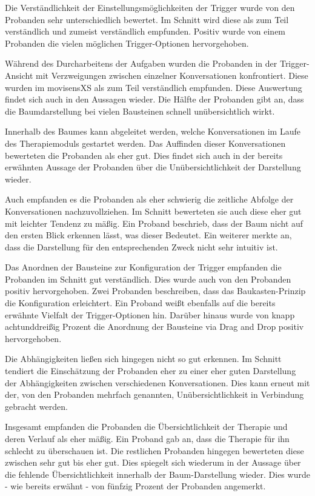 Die Verständlichkeit der Einstellungsmöglichkeiten der Trigger wurde von den Probanden sehr unterschiedlich bewertet. Im Schnitt wird diese als zum Teil verständlich und zumeist verständlich empfunden. Positiv wurde von einem Probanden die vielen möglichen Trigger-Optionen hervorgehoben.

Während des Durcharbeitens der Aufgaben wurden die Probanden in der Trigger-Ansicht mit Verzweigungen zwischen einzelner Konversationen konfrontiert. Diese wurden im movisensXS als zum Teil verständlich empfunden. Diese Auswertung findet sich auch in den Aussagen wieder. Die Hälfte der Probanden gibt an, dass die Baumdarstellung bei vielen Bausteinen schnell unübersichtlich wirkt. 

Innerhalb des Baumes kann abgeleitet werden, welche Konversationen im Laufe des Therapiemoduls gestartet werden. Das Auffinden dieser Konversationen bewerteten die Probanden als eher gut. Dies findet sich auch in der bereits erwähnten Aussage der Probanden über die Unübersichtlichkeit der Darstellung wieder. 

Auch empfanden es die Probanden als eher schwierig die zeitliche Abfolge der Konversationen nachzuvollziehen. Im Schnitt bewerteten sie auch diese eher gut mit leichter Tendenz zu mäßig. Ein Proband beschrieb, dass der Baum nicht auf den ersten Blick erkennen lässt, was dieser Bedeutet. Ein weiterer merkte an, dass die Darstellung für den entsprechenden Zweck nicht sehr intuitiv ist. 

Das Anordnen der Bausteine zur Konfiguration der Trigger empfanden die Probanden im Schnitt gut verständlich. Dies wurde auch von den Probanden positiv hervorgehoben. Zwei Probanden beschreiben, dass das Baukasten-Prinzip die Konfiguration erleichtert. Ein Proband weißt ebenfalls auf die bereits erwähnte Vielfalt der Trigger-Optionen hin. Darüber hinaus wurde von knapp achtunddreißig Prozent die Anordnung der Bausteine via Drag and Drop positiv hervorgehoben.

Die Abhängigkeiten ließen sich hingegen nicht so gut erkennen. Im Schnitt tendiert die Einschätzung der Probanden eher zu einer eher guten Darstellung der Abhängigkeiten zwischen verschiedenen Konversationen. Dies kann erneut mit der, von den Probanden mehrfach genannten, Unübersichtlichkeit in Verbindung gebracht werden. 

Insgesamt empfanden die Probanden die Übersichtlichkeit der Therapie und deren Verlauf als eher mäßig. Ein Proband gab an, dass die Therapie für ihn schlecht zu überschauen ist. Die restlichen Probanden hingegen bewerteten diese zwischen sehr gut bis eher gut. Dies spiegelt sich wiederum in der Aussage über die fehlende Übersichtlichkeit innerhalb der Baum-Darstellung wieder. Dies wurde - wie bereits erwähnt - von fünfzig Prozent der Probanden angemerkt. 

